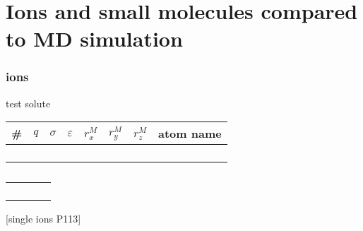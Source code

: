 
\chapter{Ions and small molecules compared to MD simulation\label{chpt:ions}}


\subsection{ions}

test solute

\begin{tabular}{|c|c|c|c|c|c|c|c|}
\hline 
\#  & $q$ & $\sigma$ & $\varepsilon$ & $r_{x}^{M}$ & $r_{y}^{M}$ & $r_{z}^{M}$ & atom name\tabularnewline
\hline 
\hline 
 &  &  &  &  &  &  & \tabularnewline
\hline 
 &  &  &  &  &  &  & \tabularnewline
\hline 
 &  &  &  &  &  &  & \tabularnewline
\hline 
 &  &  &  &  &  &  & \tabularnewline
\hline 
\end{tabular}

\begin{table}[h]
\begin{centering}
\begin{tabular*}{1\linewidth}{@{\extracolsep{\fill}}llll}
\toprule 
 &  &  & \tabularnewline
\midrule
 &  &  & \tabularnewline
 &  &  & \tabularnewline
 &  &  & \tabularnewline
 &  &  & \tabularnewline
\bottomrule
\end{tabular*}
\par\end{centering}

\caption[]{}
\end{table}


{[}single ions P113{]}
